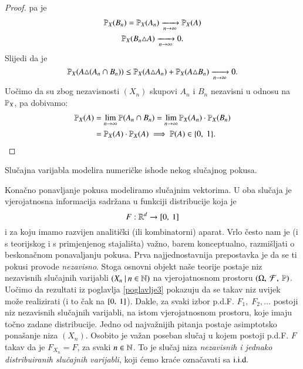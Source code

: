 \begin{proof}
    pa je
    \begin{equation*}
        \begin{gathered}
            \mathbb{P}_X (B_n) = \mathbb{P}_X (A_n) \xrightarrow[n \to \infty]{} \mathbb{P}_X (A)\\
            \mathbb{P}_X (B_n \triangle A) \xrightarrow[n \to \infty]{} 0.
        \end{gathered}
    \end{equation*}
    Slijedi da je
    \begin{equation*}
        \mathbb{P}_X (A \triangle (A_n \cap B_n)) \leq \mathbb{P}_X (A \triangle A_n) + \mathbb{P}_X (A \triangle B_n) \xrightarrow[n \to \infty]{} 0.
    \end{equation*}
    Uo\v cimo da su zbog nezavisnosti $(X_n)$ skupovi $A_n$ i $B_n$ nezavisni u odnosu na $\mathbb{P}_X$, pa dobivamo:
    \begin{equation*}
        \begin{aligned}
            \mathbb{P}_X (A)
            &= \lim\limits_{n \to \infty} \mathbb{P} (A_n \cap B_n) = \lim\limits_{n \to \infty} \mathbb{P}_X (A_n) \cdot \mathbb{P}_X (B_n)\\
            &= \mathbb{P}_X (A) \cdot \mathbb{P}_X(A) \implies \mathbb{P}(A) \in \{0, \; 1\}.
        \end{aligned}
    \end{equation*}
\end{proof}

\begin{nap} \label{nap:9.12}
    Slu\v cajna varijabla modelira numeri\v cke ishode nekog slu\v cajnog pokusa.
    
    Kona\v cno ponavljanje pokusa modeliramo slu\v cajnim vektorima.
    U oba slu\v caja je vjerojatnosna informacija sadr\v zana u funkciji distribucije koja je
    \begin{equation*}
        F: \mathbb{R}^d \to [{0}, \:{1}]
    \end{equation*}
    i za koju imamo razvijen analiti\v cki (ili kombinatorni) aparat.
    Vrlo \v cesto nam je (i s teorijskog i s primjenjenog stajali\v sta) va\v zno, barem konceptualno, razmi\v sljati o beskona\v cnom ponavaljanju pokusa.
    Prva najjednostavnija prepostavka je da se ti pokusi provode \emph{nezavisno}.
    Stoga osnovni objekt na\v se teorije postaje niz nezavisnih slu\v cajnih varijabli $({X_n} \: | \: {n \in \mathbb{N}})$ na vjerojatnosnom prostoru $(\Omega, \: \mathcal{F}, \: \mathbb{P})$.
    Uo\v cimo da rezultati iz poglavlja \ref{poglavlje3} pokazuju da se takav niz uvijek mo\v ze realizirati (i to \v cak na $[{0}, \:{1}]$).
    Dakle, za svaki izbor p.d.F. $F_1, \; F_2, \ldots$ postoji niz nezavisnih slu\v cajnih varijabli, na istom vjerojatnosnom prostoru, koje imaju to\v cno zadane distribucije.
    Jedno od najva\v znijih pitanja postaje asimptotsko pona\v sanje niza $(X_n)$.
    Osobito je va\v zan poseban slu\v caj u kojem postoji p.d.F. $F$ takav da je $F_{X_n} = F$, za svaki $n \in \mathbb{N}$.
    To je slu\v caj niza \emph{nezavisnih i jednako distribuiranih slu\v cajnih varijabli}, koji \' cemo kra\' ce ozna\v cavati sa $\mathrm{i.i.d.}$
\end{nap}